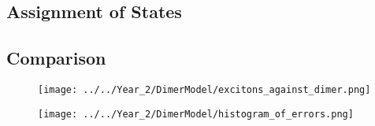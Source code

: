 \subsection{Assignment of States}
\label{subsec:state_assign}

\subsection{Comparison}
\label{subsec:comparison}
\begin{figure}
    \texttt{[image: ../../Year\_2/DimerModel/excitons\_against\_dimer.png]}
\end{figure}

\begin{figure}
    \texttt{[image: ../../Year\_2/DimerModel/histogram\_of\_errors.png]}
\end{figure}
